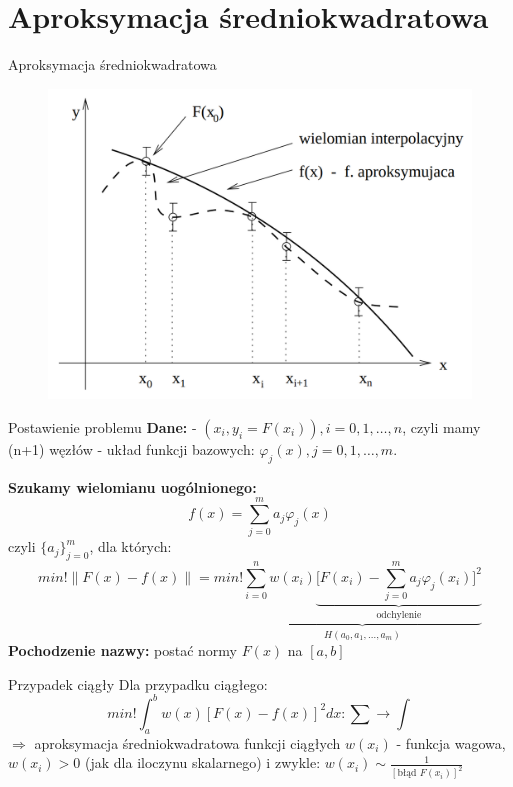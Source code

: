 \section{Aproksymacja średniokwadratowa}
\begin{frame}{Aproksymacja średniokwadratowa}
  	\begin{figure}
	\includegraphics[height=0.8\textheight]{img/5/aproksymacja_sredniokwadratowa}
	\end{figure}
\end{frame}
\begin{frame}{Postawienie problemu}
	\textbf{Dane:}\newline
    - ${(x_i,y_i = F(x_i)),i=0,1,\ldots,n}$, czyli mamy (n+1) węzłów \newline
    - układ funkcji bazowych: $\varphi_j(x), j=0,1,\ldots,m$.\newline\par
    \textbf{Szukamy wielomianu uogólnionego:}
    $$f(x) = \sum_{j = 0}^{m} a_j \varphi_j(x)$$
    czyli $\{{a_j}\}_{j=0}^m$, dla których:
    $$min!\parallel F(x) - f(x) \parallel = min!\underbrace{ \sum_{i=0}^{n}w(x_i)\underbrace{\bigg[F(x_i)-\sum_{j=0}^{m}a_j\varphi_j(x_i)\bigg]^2}_\text{odchylenie}}_{H(a_0,a_1,\ldots,a_m)}$$
    \textbf{Pochodzenie nazwy:} postać normy $F(x)$ na $[a,b]$
\end{frame}
\begin{frame}{Przypadek ciągły}
	Dla przypadku ciągłego:
    $$min!\int_a^bw(x)[F(x)-f(x)]^2dx : \sum \rightarrow \int$$
    $\Rightarrow$ aproksymacja średniokwadratowa funkcji ciągłych\newline
    $w(x_i)$ - funkcja wagowa, $w(x_i)>0$ (jak dla iloczynu skalarnego) i zwykle: $w(x_i) \sim \frac{1}{[\text{błąd }F(x_i)]^2}$ \newline
\end{frame}
